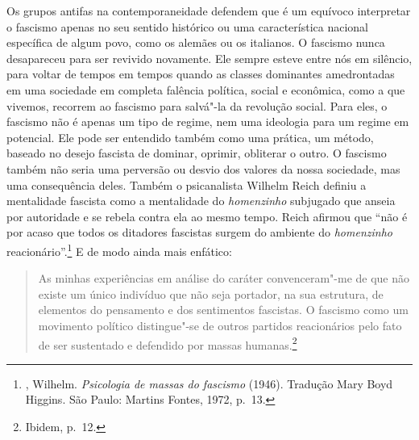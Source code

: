 Os grupos antifas na contemporaneidade defendem que é um equívoco
interpretar o fascismo apenas no seu sentido histórico ou uma
característica nacional específica de algum povo, como os alemães ou os
italianos. O fascismo nunca desapareceu para ser revivido novamente. Ele
sempre esteve entre nós em silêncio, para voltar de tempos em tempos
quando as classes dominantes amedrontadas em uma sociedade em completa
falência política, social e econômica, como a que vivemos, recorrem ao
fascismo para salvá"-la da revolução social. Para eles, o fascismo não é
apenas um tipo de regime, nem uma ideologia para um regime em potencial.
Ele pode ser entendido também como uma prática, um método, baseado no
desejo fascista de dominar, oprimir, obliterar o outro. O fascismo
também não seria uma perversão ou desvio dos valores da nossa sociedade,
mas uma consequência deles. Também o psicanalista Wilhelm Reich definiu
a mentalidade fascista como a mentalidade do \emph{homenzinho} subjugado
que anseia por autoridade e se rebela contra ela ao mesmo tempo. Reich
afirmou que ``não é por acaso que todos os ditadores fascistas surgem do
ambiente do \emph{homenzinho} reacionário''.\footnote{
  , Wilhelm. \emph{Psicologia de massas do fascismo} (1946). Tradução
  Mary Boyd Higgins. São Paulo: Martins Fontes, 1972, p.~13.} E de modo ainda mais enfático:

\begin{quote}
As minhas experiências em análise do caráter convenceram"-me de que não
existe um único indivíduo que não seja portador, na sua estrutura, de
elementos do pensamento e dos sentimentos fascistas. O fascismo como um
movimento político distingue"-se de outros partidos reacionários pelo
fato de ser sustentado e defendido por massas humanas.\footnote{Ibidem,
  p.~12.}
\end{quote}

